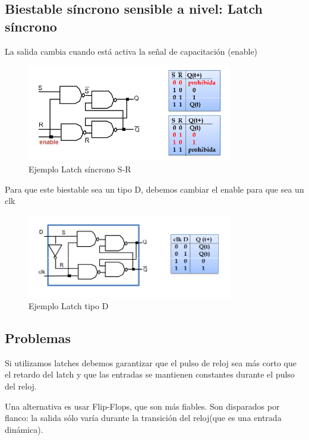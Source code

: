 \subsection{Biestable síncrono sensible a nivel: Latch síncrono}
La salida cambia cuando está activa la señal de capacitación (enable)
\begin{figure}[H]
	\centering
	\includegraphics[width=0.8\textwidth]{images/Tema_4/Ejemplo_Latch_Sincrono.PNG}
	\caption{Ejemplo Latch síncrono S-R}
\end{figure}

Para que este biestable sea un tipo D, debemos cambiar el enable para que sea un clk
\begin{figure}[H]
	\centering
	\includegraphics[width=0.8\textwidth]{images/Tema_4/Ejemplo_Latch_D.PNG}
	\caption{Ejemplo Latch tipo D}
\end{figure}

\subsection{Problemas}
Si utilizamos latches debemos garantizar que el pulso de reloj sea más corto que el retardo del latch y que las entradas se mantienen constantes durante el pulso del reloj.

Una alternativa es usar Flip-Flops, que son más fiables. Son disparados por flanco: la salida sólo varía durante la transición del reloj(que es una entrada dinámica).

